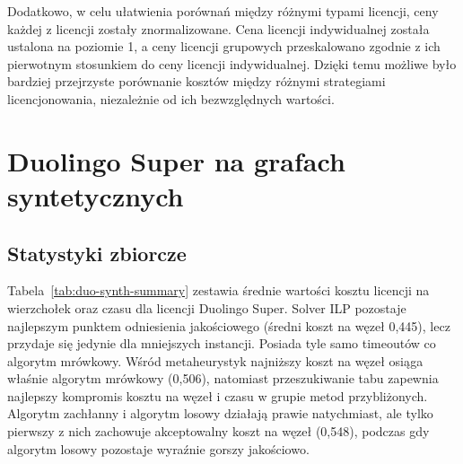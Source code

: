 Dodatkowo, w celu ułatwienia porównań między różnymi typami licencji, ceny każdej z licencji zostały znormalizowane. Cena licencji indywidualnej została ustalona na poziomie 1, a ceny licencji grupowych przeskalowano zgodnie z ich pierwotnym stosunkiem do ceny licencji indywidualnej. Dzięki temu możliwe było bardziej przejrzyste porównanie kosztów między różnymi strategiami licencjonowania, niezależnie od ich bezwzględnych wartości.

\section{Duolingo Super na grafach syntetycznych}

\subsection{Statystyki zbiorcze}
Tabela~\ref{tab:duo-synth-summary} zestawia średnie wartości kosztu licencji na wierzchołek oraz czasu dla licencji Duolingo Super. Solver ILP pozostaje najlepszym punktem odniesienia jakościowego (średni koszt na węzeł 0,445), lecz przydaje się jedynie dla mniejszych instancji. Posiada tyle samo timeoutów co algorytm mrówkowy. Wśród metaheurystyk najniższy koszt na węzeł osiąga właśnie algorytm mrówkowy (0,506), natomiast przeszukiwanie tabu zapewnia najlepszy kompromis kosztu na węzeł i czasu w grupie metod przybliżonych. Algorytm zachłanny i algorytm losowy działają prawie natychmiast, ale tylko pierwszy z nich zachowuje akceptowalny koszt na węzeł (0,548), podczas gdy algorytm losowy pozostaje wyraźnie gorszy jakościowo.

